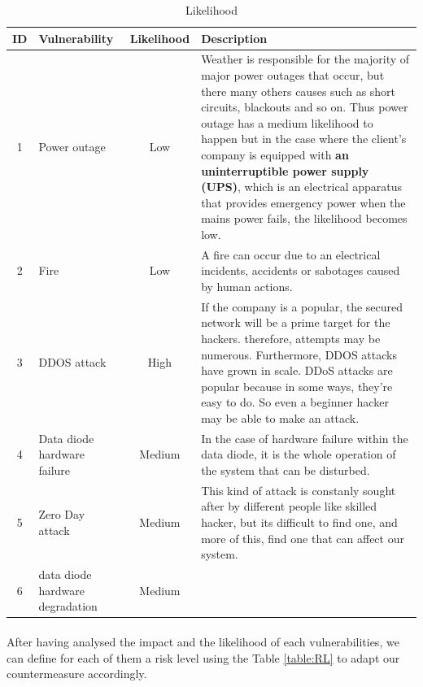 \documentclass[a4paper,10pt]{article}
\begin{document}
\begin{table}[!h]
	\centering
	\begin{tabular}{|c|p{}|c|p{10cm}|}
		\hline
		\textbf{ID}& \textbf{Vulnerability} & \textbf{Likelihood} & \textbf{Description}                 \\
		\hline
		1 & Power outage & Low & Weather is responsible for the majority of major power outages that occur, but there many others causes such as short circuits, blackouts and so on. Thus power outage has a medium likelihood to happen but in the case where the client's company is equipped with \textbf{an uninterruptible power supply (UPS)}, which is an electrical apparatus that provides emergency power when the mains power fails, the likelihood becomes low.    \\
		\hline
		2 & Fire & Low  &  A fire can occur due to an electrical incidents, accidents or sabotages caused by human actions.\\
		\hline
		3 & DDOS attack & High & If the company is a popular, the secured network will be a prime target for the hackers. therefore, attempts may be numerous. Furthermore, DDOS attacks have grown in scale. DDoS attacks are popular because in some ways, they're easy to do. So even a beginner hacker may be able to make an attack.\\
		\hline
		4 & Data diode hardware failure  & Medium & In the case of hardware failure within the data diode, it is the whole operation of the system that can be disturbed.\\
		\hline
		5 & Zero Day attack & Medium & This kind of attack is constanly sought after by different people like skilled hacker, but its difficult to find one, and more of this, find one that can affect our system. \\
		\hline
		6 & data diode hardware degradation & Medium & \\
		\hline
	\end{tabular}
	\caption{Likelihood}
\end{table}

\paragraph{} After having analysed the impact and the likelihood of each vulnerabilities, we can define for each of them a risk level using the Table \ref{table:RL} to adapt our countermeasure accordingly.
\end{document}
